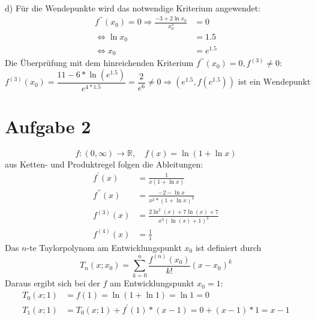 \documentclass[a4paper]{article}
\begin{document}
\newpage

\par{d)} Für die Wendepunkte wird das notwendige Kriterium angewendet:
\begin{align*}
	f^{\prime\prime} (x_0)= 0 \Rightarrow \frac{-3+2 \ln x_0}{x_0^3} &= 0\\
	\Leftrightarrow \ln x_0 &= 1.5 \\
	\Leftrightarrow x_0 &= e^{1.5}
\end{align*}
Die Überprüfung mit dem hinreichenden Kriterium $f^{\prime\prime} (x_0) = 0, f^{(3)} \neq 0$:
\[ 
	f^{(3)} (x_0) = \frac{11 - 6*\ln(e^{1.5})}{e^{4*1.5}} = \frac{2}{e^6} \neq 0 
	\Longrightarrow (e^{1.5}, f(e^{1.5})) \text{ ist ein Wendepunkt}
\]

\newpage

\section*{Aufgabe 2}
\[ f: (0,\infty) \rightarrow \mathbb{R}, \quad f(x) = \ln(1 + \ln x) \]
aus Ketten- und Produktregel folgen die Ableitungen:
\begin{align*}
	f^\prime (x) &=
	\frac{1}{x (1+\ln x)} \\
	f^{\prime\prime} (x) &=
	\frac{-2 - \ln x}{x^2 * (1+\ln x)^2}\\
	f^{(3)} (x) &=
	\frac{2\ln^2\left(x\right)+7\ln\left(x\right)+7}{x^3\left(\ln\left(x\right)+1\right)^3} \\
	f^{(4)} (x) &=
	\frac{1}{1}
\end{align*}
Das $n$-te Taylorpolynom am Entwicklungspunkt $x_0$ ist definiert durch
\[
	T_n(x;x_0) = \sum_{k=0}^n \frac{f^{(n)}(x_0)}{k!} (x-x_0)^k
	\]
Daraus ergibt sich bei der $f$ am Entwicklungspunkt $x_0 = 1$:
\begin{align*}
	T_0(x;1) &=
	f(1) = \ln (1 + \ln 1) = \ln 1 = 0 \\
	T_1(x;1) &=
	T_0(x;1) + f^\prime(1) * (x-1) = 0 + (x-1) * 1 = x - 1
\end{align*}
\end{document}
